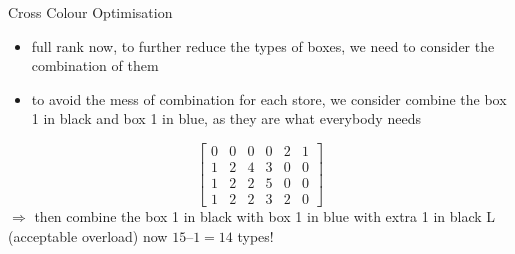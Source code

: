 \begin{frame}
\begin{frame}
	\end{frame}
	\begin{frame}{Cross Colour Optimisation}
	\begin{itemize}
	\item full rank now, to further reduce the types of boxes, we need to consider the combination of them
	\item to avoid the mess of combination for each store, we consider combine the box 1 in black and box 1 in blue, as they are what everybody needs
	\end{itemize}\begin{equation}
	\begin{bmatrix}
		0& 0& 0& 0& 2& 1\\
		1& 2& 4& 3& 0& 0 \\
		 1& 2& 2& 5& 0& 0\\
		 1& 2& 2& 3& 2& 0

	\end{bmatrix}\end{equation}
			$\Rightarrow$ then combine the box 1 in black with box 1 in blue with extra 1 in black L (acceptable overload)
now $15 – 1 = 14$ types!
	\end{frame}





\end{frame}
	

	
